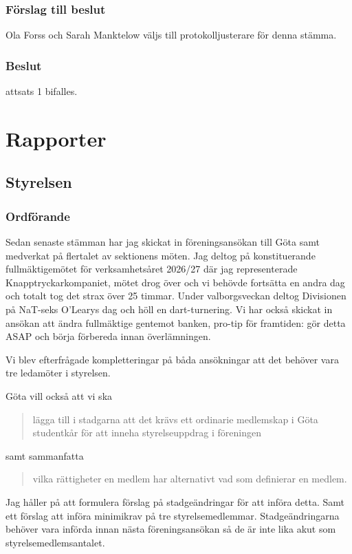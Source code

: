 \documentclass[protokoll]{dvd}
\begin{document}
\subsubsection*{Förslag till beslut}
\begin{attsatser}
    \item Ola Forss och Sarah  Manktelow väljs till protokolljusterare för denna stämma.
\end{attsatser}

\subsubsection*{Beslut}
\begin{attsatser}
    \item attsats 1 bifalles.
\end{attsatser}

\newpage

\section{Rapporter}

\subsection{Styrelsen}

\subsubsection*{Ordförande}
Sedan senaste stämman har jag skickat in föreningsansökan till Göta samt medverkat på flertalet av sektionens möten. Jag deltog på konstituerande fullmäktigemötet för verksamhetsåret 2026/27 där jag representerade Knapptryckarkompaniet, mötet drog över och vi behövde fortsätta en andra dag och totalt tog det strax över 25 timmar. Under valborgsveckan deltog Divisionen på NaT-seks O'Learys dag och höll en dart-turnering. 
Vi har också skickat in ansökan att ändra fullmäktige gentemot banken, pro-tip för framtiden: gör detta ASAP och börja förbereda innan överlämningen.

Vi blev efterfrågade kompletteringar på båda ansökningar att det behöver vara tre ledamöter i styrelsen. 

Göta vill också att vi ska 
\begin{quote}
     lägga till i stadgarna att det krävs ett ordinarie medlemskap i Göta studentkår för att inneha styrelseuppdrag i föreningen
\end{quote}
samt sammanfatta
\begin{quote}
    vilka rättigheter en medlem har alternativt vad som definierar en medlem.
\end{quote}
Jag håller på att formulera förslag på stadgeändringar för att införa detta. Samt ett förslag att införa minimikrav på tre styrelsemedlemmar. 
Stadgeändringarna behöver vara införda innan nästa föreningsansökan så de är inte lika akut som styrelsemedlemsantalet.
\end{document}
